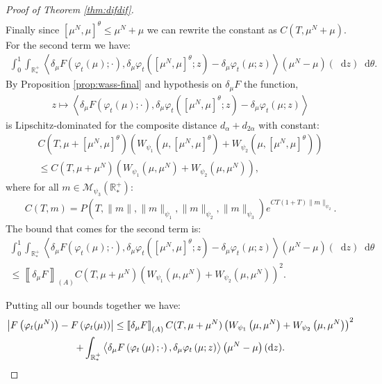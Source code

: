 \documentclass[11pt,a4paper]{article}
\newcommand{\RRP}{\mathbb{R}^+_*}
\newcommand{\MC}{\mathcal{M}}
\newcommand{\A}{(A)}
\newcommand{\brac}[1]{\left\langle#1\right\rangle}
\newcommand{\dd}{\mathop{}\!\mathrm{d}}
\begin{document}
\begin{proof}[Proof of Theorem \ref{thm:difdif}]
\begin{multline*}
    \end{multline*}
    Finally since $\left[\mu^N,\mu \right]^\theta \leq \mu^N + \mu$ we can rewrite the constant as $C(T,\mu^N + \mu)$. For the second term we have:
    \begin{align*}
        \int_0^1 \int_{\RRP} \brac{\delta_\mu F\left(\varphi_t \left(\mu\right);\cdot \right), \delta_\mu \varphi_t\left(\left[\mu^N,\mu \right]^\theta;z \right) -  \delta_\mu \varphi_t\left(\mu;z \right)} \left(\mu^N - \mu\right)(\dd z)\dd \theta.
    \end{align*}
    By Proposition \ref{prop:wass-final} and hypothesis on $\delta_\mu F$ the function,
    \begin{align*}
        z \mapsto \brac{\delta_\mu F\left(\varphi_t \left(\mu\right);\cdot \right), \delta_\mu \varphi_t\left(\left[\mu^N,\mu \right]^\theta;z \right) -  \delta_\mu \varphi_t\left(\mu;z \right)}
    \end{align*}
    is Lipschitz-dominated for the composite distance $d_\alpha + d_{2\alpha}$ with constant: 
    \begin{multline*}
        C(T,\mu + \left[\mu^N,\mu \right]^\theta)\left(W_{\psi_1}\left(\mu,\left[\mu^N,\mu \right]^\theta\right) +W_{\psi_2}\left(\mu,\left[\mu^N,\mu \right]^\theta\right) \right) \\
        \leq C(T,\mu + \mu^N)\left(W_{\psi_1}\left(\mu,\mu^N\right) +W_{\psi_2}\left(\mu,\mu^N\right) \right),
    \end{multline*}
    where for all $m \in \MC_{\psi_3}(\RRP)$:
    \begin{align*}
        C(T,m) = P(T,\|m\|,\|m\|_{\psi_1},\|m\|_{\psi_2},\|m\|_{\psi_3})e^{CT(1 + T)\|m\|_{\psi_2}}.
    \end{align*}
    The bound that comes for the second term is:
    \begin{multline*}
        \int_0^1 \int_{\RRP} \brac{\delta_\mu F\left(\varphi_t \left(\mu\right);\cdot \right), \delta_\mu \varphi_t\left(\left[\mu^N,\mu \right]^\theta;z \right) -  \delta_\mu \varphi_t\left(\mu;z \right)} \left(\mu^N - \mu\right)(\dd z)\dd \theta \\
        \leq \left\llbracket \delta_\mu F \right\rrbracket_{\A} C(T,\mu + \mu^N)\left(W_{\psi_1}\left(\mu,\mu^N\right) +W_{\psi_2}\left(\mu,\mu^N\right) \right)^2.
    \end{multline*}

    Putting all our bounds together we have:
    \begin{multline*}
        \left|F\left(\varphi_t(\mu^N)\right) - F\left(\varphi_t(\mu)\right) \right| \leq \left\llbracket \delta_\mu F \right\rrbracket_{\A}C(T,\mu + \mu^N)\left(W_{\psi_1}\left(\mu,\mu^N\right) +W_{\psi_2}\left(\mu,\mu^N\right) \right)^2 \\
        + \int_{\RRP} \brac{\vphantom{A^2}\delta_\mu F\left(\varphi_t \left(\mu\right);\cdot \right), \delta_\mu \varphi_t\left(\mu;z \right)} \left(\mu^N - \mu\right)(\dd z).
    \end{multline*}
\end{proof}
\end{document}
